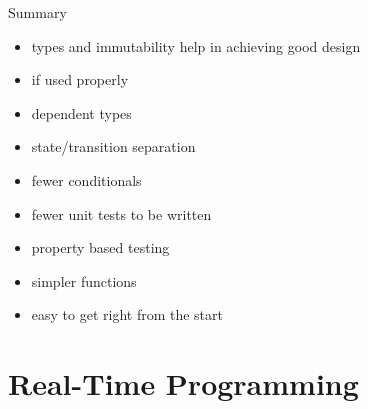 \documentclass{beamer}
\begin{document}
\begin{frame}{Summary}
  \begin{itemize}[<+->]
    \item types and immutability help in achieving good design
    \item if used properly
    \item dependent types
    \item state/transition separation
    \item fewer conditionals
    \item fewer unit tests to be written
    \item property based testing
    \item simpler functions
    \item easy to get right from the start
  \end{itemize}
\end{frame}

\section{Real-Time Programming}
\frame{\tableofcontents[currentsection]}
\end{document}
